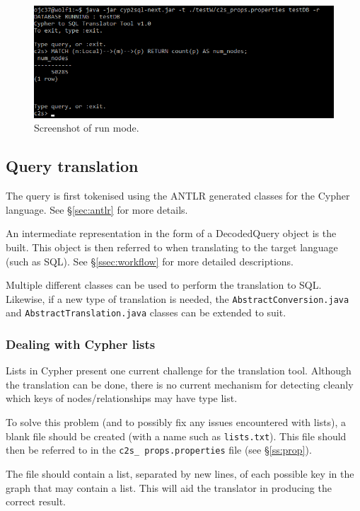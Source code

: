 \documentclass[letterpaper]{ltxdoc}
\begin{document}
\begin{figure}[h]
\centerline{\includegraphics[width=\textwidth,height=\textheight,keepaspectratio]{ss2.png}}
\caption{Screenshot of run mode.}
\label{ss2}
\end{figure}


\subsection{Query translation}
The query is first tokenised using the ANTLR generated classes for the Cypher language. See \S \ref{sec:antlr} for more details.

An intermediate representation in the form of a DecodedQuery object is the built. This object is then referred to when translating to the target language (such as SQL). See \S \ref{ssec:workflow} for more detailed descriptions.

Multiple different classes can be used to perform the translation to SQL. Likewise, if a new type of translation is needed, the \texttt{AbstractConversion.java} and \texttt{AbstractTranslation.java} classes can be extended to suit.

\subsubsection{Dealing with Cypher lists}
\label{sssec:lists}
Lists in Cypher present one current challenge for the translation tool. Although the translation can be done, there is no current mechanism for detecting cleanly which keys of nodes/relationships may have type list.

To solve this problem (and to possibly fix any issues encountered with lists), a blank file should be created (with a name such as \texttt{lists.txt}). This file should then be referred to in the \texttt{c2s\_ props.properties} file (see \S \ref{ss:prop}).

The file should contain a list, separated by new lines, of each possible key in the graph that may contain a list. This will aid the translator in producing the correct result.
\end{document}
